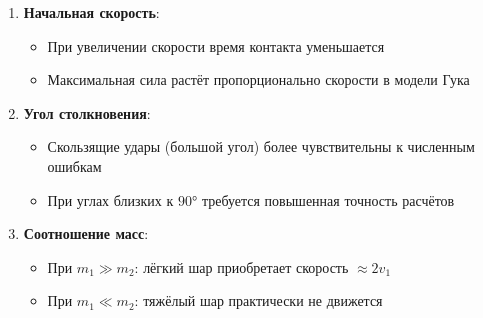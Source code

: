 \begin{enumerate}
    \item \textbf{Начальная скорость}:
    \begin{itemize}
        \item При увеличении скорости время контакта уменьшается
        \item Максимальная сила растёт пропорционально скорости в модели Гука
    \end{itemize}

    \item \textbf{Угол столкновения}:
    \begin{itemize}
        \item Скользящие удары (большой угол) более чувствительны к численным ошибкам
        \item При углах близких к $90°$ требуется повышенная точность расчётов
    \end{itemize}

    \item \textbf{Соотношение масс}:
    \begin{itemize}
        \item При $m_1 \gg m_2$: лёгкий шар приобретает скорость $\approx 2v_1$
        \item При $m_1 \ll m_2$: тяжёлый шар практически не движется
    \end{itemize}
\end{enumerate}

\newpage